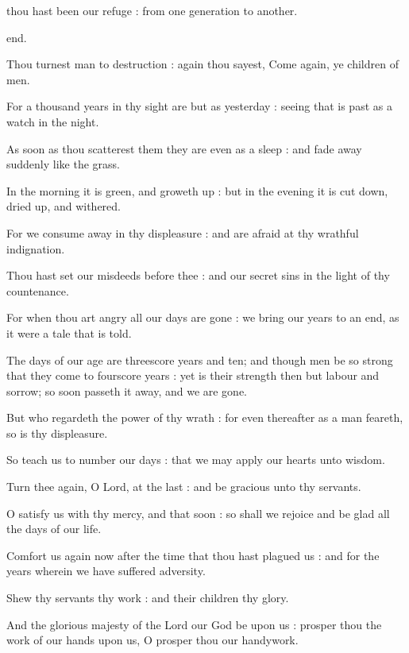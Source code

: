  thou hast been our refuge : from one generation to another.\par
\noindent
end.\par
{}Thou turnest man to destruction : again thou sayest, Come again, ye children of men.\par
{}For a thousand years in thy sight are but as yesterday : seeing that is past as a watch in the night.\par
{}As soon as thou scatterest them they are even as a sleep : and fade away suddenly like the grass.\par
{}In the morning it is green, and groweth up : but in the evening it is cut down, dried up, and withered.\par
{}For we consume away in thy displeasure : and are afraid at thy wrathful indignation.\par
{}Thou hast set our misdeeds before thee : and our secret sins in the light of thy countenance.\par
{}For when thou art angry all our days are gone : we bring our years to an end, as it were a tale that is told.\par
{}The days of our age are threescore years and ten; and though men be so strong that they come to fourscore years : yet is their strength then but labour and sorrow; so soon passeth it away, and we are gone.\par
{}But who regardeth the power of thy wrath : for even thereafter as a man feareth, so is thy displeasure.\par
{}So teach us to number our days : that we may apply our hearts unto wisdom.\par
{}Turn thee again, O Lord, at the last : and be gracious unto thy servants.\par
{}O satisfy us with thy mercy, and that soon : so shall we rejoice and be glad all the days of our life.\par
{}Comfort us again now after the time that thou hast plagued us : and for the years wherein we have suffered adversity.\par
{}Shew thy servants thy work : and their children thy glory.\par
{}And the glorious majesty of the Lord our God be upon us : prosper thou the work of our hands upon us, O prosper thou our handywork.\par

